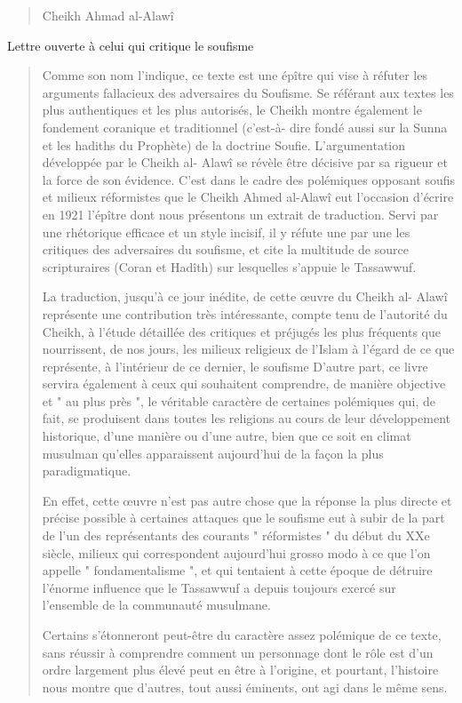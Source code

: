 \begin{quote}
Cheikh Ahmad al-Alawî
\end{quote}

Lettre ouverte à celui qui critique le soufisme

\begin{quote}
Comme son nom l'indique, ce texte est une épître qui vise à réfuter les
arguments fallacieux des adversaires du Soufisme. Se référant aux textes
les plus authentiques et les plus autorisés, le Cheikh montre également
le fondement coranique et traditionnel (c'est-à- dire fondé aussi sur la
Sunna et les hadiths du Prophète) de la doctrine Soufie. L'argumentation
développée par le Cheikh al- Alawî se révèle être décisive par sa
rigueur et la force de son évidence. C'est dans le cadre des polémiques
opposant soufis et milieux réformistes que le Cheikh Ahmed al-Alawî eut
l'occasion d'écrire en 1921 l'épître dont nous présentons un extrait de
traduction. Servi par une rhétorique efficace et un style incisif, il y
réfute une par une les critiques des adversaires du soufisme, et cite la
multitude de source scripturaires (Coran et Hadîth) sur lesquelles
s'appuie le Tassawwuf.

La traduction, jusqu'à ce jour inédite, de cette œuvre du Cheikh al-
Alawî représente une contribution très intéressante, compte tenu de
l'autorité du Cheikh, à l'étude détaillée des critiques et préjugés les
plus fréquents que nourrissent, de nos jours, les milieux religieux de
l'Islam à l'égard de ce que représente, à l'intérieur de ce dernier, le
soufisme D'autre part, ce livre servira également à ceux qui souhaitent
comprendre, de manière objective et " au plus près ", le véritable
caractère de certaines polémiques qui, de fait, se produisent dans
toutes les religions au cours de leur développement historique, d'une
manière ou d'une autre, bien que ce soit en climat musulman qu'elles
apparaissent aujourd'hui de la façon la plus paradigmatique.

En effet, cette œuvre n'est pas autre chose que la réponse la plus
directe et précise possible à certaines attaques que le soufisme eut à
subir de la part de l'un des représentants des courants " réformistes "
du début du XXe siècle, milieux qui correspondent aujourd'hui grosso
modo à ce que l'on appelle " fondamentalisme ", et qui tentaient à cette
époque de détruire l'énorme influence que le Tassawwuf a depuis toujours
exercé sur l'ensemble de la communauté musulmane.

Certains s'étonneront peut-être du caractère assez polémique de ce
texte, sans réussir à comprendre comment un personnage dont le rôle est
d'un ordre largement plus élevé peut en être à l'origine, et pourtant,
l'histoire nous montre que d'autres, tout aussi éminents, ont agi dans
le même sens.


\end{quote}
